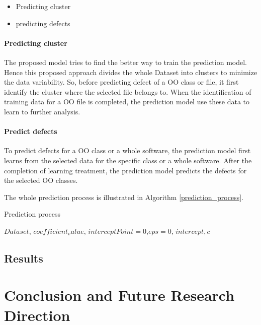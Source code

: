 \documentclass[12pt]{report}
\begin{document}
\begin{itemize}
	\item Predicting cluster
	\item predicting defects
\end{itemize}

\subsubsection{	Predicting cluster}
The proposed model tries to find the better way to train the prediction model. Hence this proposed approach divides the whole Dataset into clusters to minimize the data variability. So, before predicting defect of a OO class or file, it first identify the cluster where the selected file belongs to. When the identification of training data for a OO file is completed, the prediction model use these data to learn to further analysis. 
%
\subsubsection{Predict defects}
To predict defects for a OO class or a whole software, the prediction model first learns from the selected data for the specific class or a whole software. After the completion of learning treatment, the prediction model predicts the defects for the selected OO classes.

The whole prediction process is illustrated in Algorithm \ref{prediction_process}.

\begin{algorithm}
	\caption{Prediction process}
	\label{prediction_process}
		\begin{algorithmic}[1]
			\REQUIRE  $ Dataset$, $coefficient_value$, $interceptPoint=0$,$eps=0$, $intercept, c$
			
		\end{algorithmic}
	\end{algorithm}
	
	
\section{Results}



\chapter{Conclusion and Future Research Direction}


\begin{singlespace}


\end{singlespace}
\end{document}
